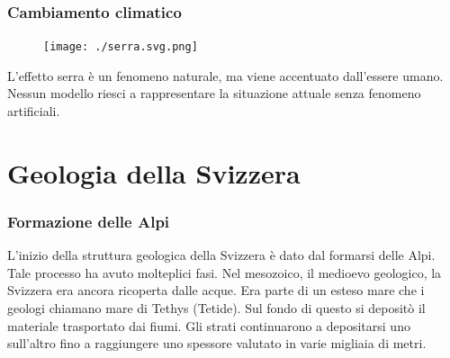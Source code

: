 \documentclass[a4paper]{article}
\begin{document}


\pagebreak

\section{Cambiamento climatico}


\begin{center}
\begin{figure}[h]
    \centering
    \texttt{[image: ./serra.svg.png]}
\end{figure}
\end{center}

L'effetto serra è un fenomeno naturale, ma viene accentuato dall'essere umano.
Nessun modello riesci a rappresentare la situazione attuale senza fenomeno artificiali.

\pagebreak

\part{Geologia della Svizzera}

\section{Formazione delle Alpi}

L'inizio della struttura geologica della Svizzera è dato dal formarsi delle Alpi. Tale processo
ha avuto molteplici fasi. Nel mesozoico, il medioevo geologico, la Svizzera era ancora ricoperta
dalle acque. Era parte di un esteso mare che i geologi chiamano mare di Tethys (Tetide). Sul
fondo di questo si depositò il materiale trasportato dai fiumi. Gli strati continuarono a
depositarsi uno sull'altro fino a raggiungere uno spessore valutato in varie migliaia di metri.
\end{document}
